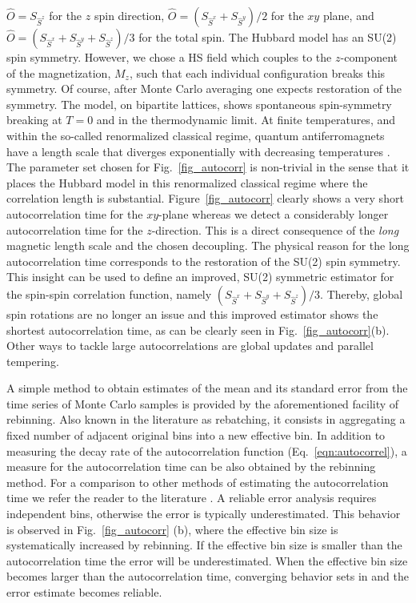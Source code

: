 $\hat{O} = S_{\hat{S}^{z}}$ for the $z$ spin direction, 
$\hat{O} =(S_{\hat{S}^{x}} + S_{\hat{S}^{y}})/2$ for the $xy$ plane, and
$\hat{O} =(S_{\hat{S}^{x}} + S_{\hat{S}^{y}}+ S_{\hat{S}^{z}})/3$ for the total spin.
The Hubbard model has an SU(2) spin symmetry. However, we chose a HS field which couples to the $z$-component of the magnetization,  $M_z$,  such that each individual configuration breaks this symmetry. Of course, after Monte Carlo averaging one expects restoration of the symmetry. The model, on bipartite  lattices,  shows spontaneous spin-symmetry breaking at $T=0$ and in the thermodynamic limit.  At finite temperatures, and within the so-called renormalized classical regime,  quantum antiferromagnets have a length scale  that  diverges  exponentially  with decreasing temperatures \cite{Chakravarty88}.     
The parameter set chosen for Fig.~\ref{fig_autocorr}  is non-trivial in the sense that it places the Hubbard model in this renormalized classical regime where the correlation length is substantial.  Figure~\ref{fig_autocorr}  clearly shows a very short autocorrelation time for the $xy$-plane whereas we detect a considerably longer  autocorrelation time  for the $z$-direction.  This is a direct consequence of the \emph{long} magnetic length scale and the chosen decoupling.
The physical reason for the long autocorrelation time  corresponds to  the restoration of the SU(2) spin symmetry.    This insight can be used to define an improved, SU(2) symmetric estimator for the spin-spin correlation function, namely
$(S_{\hat{S}^{x}} + S_{\hat{S}^{y}} + S_{\hat{S}^{z}})/3$. 
Thereby, global spin rotations are no longer an issue and this improved estimator  shows the shortest autocorrelation time, as can be clearly seen in Fig.~\ref{fig_autocorr}(b). Other ways to tackle large autocorrelations are global updates and parallel tempering.

A simple method to obtain estimates of the mean and its standard error from the time series of Monte Carlo samples is provided by the aforementioned facility of rebinning. Also known in the literature as rebatching, it consists in aggregating a fixed number  of adjacent original bins into a new effective bin.
In addition to measuring the decay rate of the autocorrelation function (Eq.~\eqref{eqn:autocorrel}), a measure for the autocorrelation time  can be also obtained by the rebinning method. 
For a comparison to other methods of estimating the autocorrelation time we refer the reader to the literature \cite{Thompson2010, Geyer1992, neal1993}.
A reliable error analysis requires independent bins, otherwise the error is typically underestimated. This behavior is observed in Fig.~\ref{fig_autocorr} (b), where the effective bin size is systematically increased by rebinning. If the effective bin size is smaller than the autocorrelation time the error will be underestimated. When the effective bin size becomes  larger than the autocorrelation time, converging behavior sets in and the error estimate becomes reliable.


